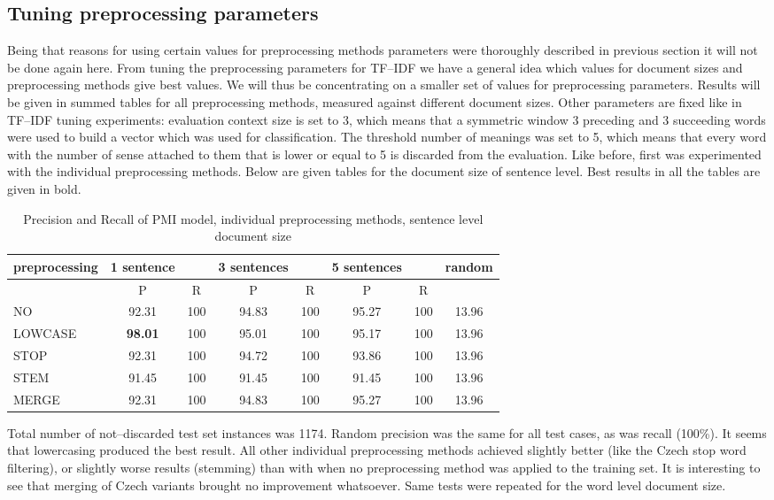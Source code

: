 \subsection{Tuning preprocessing parameters}
Being that reasons for using certain values for preprocessing methods parameters were thoroughly described in 
previous section it will not be done again here. From tuning the preprocessing 
parameters for TF--IDF we have a general idea which values for document sizes and preprocessing 
methods give best values. We will thus be concentrating on a smaller set of values for preprocessing parameters. 
Results will be given in summed tables for all preprocessing methods, measured against different 
document sizes.  Other parameters are fixed like in TF--IDF tuning experiments: 
evaluation context size is set to 3, which means that a symmetric window 3 preceding and 3 succeeding words were used to build a vector which was used for classification. The threshold number of meanings was set to 5, which means that every word with the number of sense attached to them that is lower or equal to 5 is discarded from the evaluation. Like before, first was experimented with the individual preprocessing methods. 
Below are given tables for the document size of sentence level. Best results in all the tables are given in bold. 
\begin{table}[h!]
\begin{tabular}{ l | c c | c c | c c | c}
   preprocessing &  1 sentence && 3 sentences && 5 sentences  && random\\
\hline
	& P  &  R & P  &  R & P  &  R &\\
\hline\hline
NO  & 92.31 & 100 & 94.83 & 100 & 95.27 & 100 &  13.96 \\
LOWCASE  & \textbf{98.01} & 100 & 95.01 & 100 & 95.17 & 100 & 13.96  \\
STOP  & 92.31 & 100 & 94.72 & 100 & 93.86 & 100 & 13.96 \\
STEM  & 91.45 & 100 & 91.45 & 100 & 91.45 & 100 & 13.96\\
MERGE  & 92.31 & 100 & 94.83 & 100 & 95.27 & 100 & 13.96 \\
\end{tabular}
\caption{Precision and Recall of PMI model, individual preprocessing methods, sentence level document size}
\end{table}

Total number of not--discarded test set instances was 1174. Random precision was the same for all test cases, as 
was recall (100\%). It seems that lowercasing produced the best result. All other individual preprocessing 
methods achieved slightly better (like the Czech stop word filtering), or slightly worse results (stemming) than with when no preprocessing method was applied to the training set. It is interesting to see that merging of Czech variants brought no improvement whatsoever. Same tests were repeated for the word level document size.

